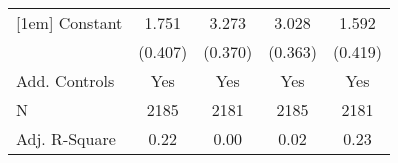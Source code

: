 {\begin{tabular}{l*{4}{c}}
[1em]
Constant            &       1.751\sym{***}&       3.273\sym{***}&       3.028\sym{***}&       1.592\sym{***}\\
                    &     (0.407)         &     (0.370)         &     (0.363)         &     (0.419)         \\
[1em]
Add. Controls       &         Yes         &         Yes         &         Yes         &         Yes         \\
\hline
N                   &        2185         &        2181         &        2185         &        2181         \\
Adj. R-Square       &        0.22         &        0.00         &        0.02         &        0.23         \\
\hline\hline
\end{tabular}
}
